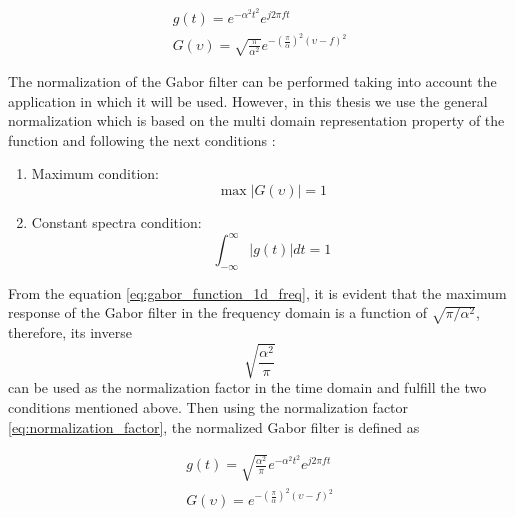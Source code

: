 \begin{equation}\label{eq:gabor_function_1d_timefreq_compact}
    \begin{gathered}
         g(t) =  e ^{-\alpha^2 t^2} e ^{j 2 \pi f t } \\
         G(\upsilon) =  \sqrt{\frac{\pi}{\alpha^2}} e ^{-\left(\frac{\pi}{\alpha}\right) ^{2} (\upsilon-f)^2} 
     \end{gathered}
\end{equation}

The normalization of the Gabor filter can be performed taking into account the application in which it will be used. However, in this thesis we use the general normalization which is based on the multi domain representation property of the function and following the next conditions \citep{Boukerroui.Noble.ea:JMIV:2004}:

\begin{enumerate}
    \item Maximum condition:
        \begin{equation}\label{eq:maximun_condition}
            \max{|G(\upsilon)|} = 1
        \end{equation}
    \item Constant spectra condition:
        \begin{equation}\label{eq:constant_spectrum_condition}
            \int_{-\infty}^{\infty} |g(t)| dt = 1
        \end{equation}        
\end{enumerate}

From the equation \eqref{eq:gabor_function_1d_freq}, it is evident that the maximum response of the Gabor filter in the frequency domain is a function of $\sqrt{\pi/\alpha^2}$, therefore, its inverse
\begin{equation}\label{eq:normalization_factor}
    \sqrt{\frac{\alpha^2}{\pi}}
\end{equation}
can be used as the normalization factor in the time domain and fulfill the two conditions mentioned above. Then using the normalization factor \eqref{eq:normalization_factor}, the normalized Gabor filter is defined as

\begin{equation}\label{eq:gabor_function_1d_timefreq_normalized}
    \begin{gathered}
         g(t) =  \sqrt{\frac{\alpha^2}{\pi}} e ^{-\alpha^2 t^2} e ^{j 2 \pi f t } \\
         G(\upsilon) =  e ^{-\left(\frac{\pi}{\alpha}\right) ^2 (\upsilon-f)^2}
     \end{gathered}
\end{equation}

